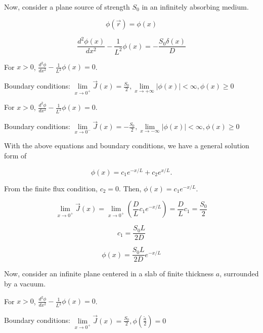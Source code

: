 \documentclass[12pt]{article}
\newcommand{\rvec}{\ensuremath{\vec{r}}}
\begin{document}
Now, consider a plane source of strength $S_0$ in an infinitely absorbing medium.

\begin{equation*}
\phi(\rvec) = \phi(x)
\end{equation*}

\begin{equation*}
\frac{d^2\phi(x)}{dx^2} - \frac{1}{L^2}\phi(x) = -\frac{S_0\delta(x)}{D}
\end{equation*}

For $x > 0$, $\frac{d^2\phi}{dx^2} - \frac{1}{L^2}\phi(x) = 0$.


Boundary conditions: 
$\lim\limits_{x\rightarrow 0^+}\vec{J}(x) = \frac{S_0}{2}, \lim\limits_{x\rightarrow +\infty}|\phi(x)|<\infty, \phi(x) \geq 0$

For $x > 0$, $\frac{d^2\phi}{dx^2} - \frac{1}{L^2}\phi(x) = 0$.


Boundary conditions: 
$\lim\limits_{x\rightarrow 0^-}\vec{J}(x) = -\frac{S_0}{2}, \lim\limits_{x\rightarrow -\infty}|\phi(x)|<\infty, \phi(x) \geq 0$

With the above equations and boundary conditions, we have a general solution form of

\begin{equation*}
\phi(x) = c_1e^{-x/L} + c_2e^{x/L}.
\end{equation*}

From the finite flux condition, $c_2 = 0$. Then, $\phi(x) = c_1e^{-x/L}$.

\begin{equation*}
\lim\limits_{x\to 0^+} \vec{J}(x) = \lim\limits_{x\to 0^+}\left(\frac{D}{L}c_1e^{-x/L}\right) = 
\frac{D}{L}c_1 = \frac{S_0}{2}
\end{equation*}

\begin{equation*}
c_1 = \frac{S_0 L}{2D}
\end{equation*}

\begin{equation*}
\phi(x) = \frac{S_0L}{2D}e^{-x/L}
\end{equation*}

Now, consider an infinite plane centered in a slab of finite thickness $a$, surrounded by a vacuum.


For $x > 0$, $\frac{d^2\phi}{dx^2} - \frac{1}{L^2}\phi(x) = 0$.


Boundary conditions: 
$\lim\limits_{x\rightarrow 0^+}\vec{J}(x) = \frac{S_0}{2}, \phi(\tfrac{\tilde{a}}{2}) = 0$
\end{document}
